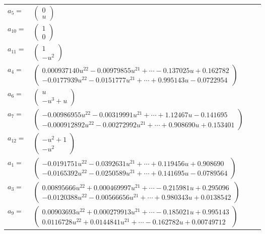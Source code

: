 \documentclass[1p]{elsarticle_modified}
\theoremstyle{definition}
\begin{document}
\begin{tabular}{m{7pt} m{180pt} m{7pt} m{180pt} }
\flushright $a_{5}=$&$\begin{pmatrix}0\\u\end{pmatrix}$ \\
\flushright $a_{10}=$&$\begin{pmatrix}1\\0\end{pmatrix}$ \\
\flushright $a_{11}=$&$\begin{pmatrix}1\\- u^2\end{pmatrix}$ \\
\flushright $a_{4}=$&$\begin{pmatrix}0.000937140 u^{22}-0.00979855 u^{21}+\cdots-0.137025 u+0.162782\\-0.0177939 u^{22}-0.0151777 u^{21}+\cdots+0.995143 u-0.0722954\end{pmatrix}$ \\
\flushright $a_{6}=$&$\begin{pmatrix}u\\- u^3+u\end{pmatrix}$ \\
\flushright $a_{7}=$&$\begin{pmatrix}-0.00986955 u^{22}-0.00319991 u^{21}+\cdots+1.12467 u-0.141695\\-0.000912892 u^{22}-0.00272992 u^{21}+\cdots+0.908690 u+0.153401\end{pmatrix}$ \\
\flushright $a_{12}=$&$\begin{pmatrix}- u^2+1\\- u^2\end{pmatrix}$ \\
\flushright $a_{1}=$&$\begin{pmatrix}-0.0191751 u^{22}-0.0392631 u^{21}+\cdots+0.119456 u+0.908690\\-0.0165392 u^{22}-0.0250589 u^{21}+\cdots+0.141695 u-0.0789564\end{pmatrix}$ \\
\flushright $a_{3}=$&$\begin{pmatrix}0.00895666 u^{22}+0.000469997 u^{21}+\cdots-0.215981 u+0.295096\\-0.0120388 u^{22}-0.00566656 u^{21}+\cdots+0.980343 u+0.0138542\end{pmatrix}$ \\
\flushright $a_{9}=$&$\begin{pmatrix}0.00903693 u^{22}+0.000279913 u^{21}+\cdots-0.185021 u+0.995143\\0.0116728 u^{22}+0.0144841 u^{21}+\cdots-0.162782 u+0.00749712\end{pmatrix}$ \\

\end{tabular}
\end{document}
